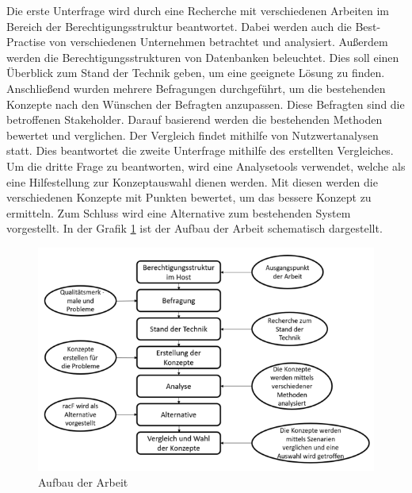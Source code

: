 Die erste Unterfrage wird durch eine Recherche mit verschiedenen Arbeiten im Bereich der Berechtigungsstruktur beantwortet.
Dabei werden auch die Best-Practise von verschiedenen Unternehmen betrachtet und analysiert.
Außerdem werden die Berechtigungsstrukturen von Datenbanken beleuchtet.
Dies soll einen Überblick zum Stand der Technik geben, um eine geeignete Lösung zu finden.
\newline
Anschließend wurden mehrere Befragungen durchgeführt, um die bestehenden Konzepte nach den Wünschen der Befragten anzupassen.
Diese Befragten sind die betroffenen Stakeholder.
Darauf basierend werden die bestehenden Methoden bewertet und verglichen.
Der Vergleich findet mithilfe von Nutzwertanalysen statt.
Dies beantwortet die zweite Unterfrage mithilfe des erstellten Vergleiches.
\newline
Um die dritte Frage zu beantworten, wird eine Analysetools verwendet, welche als eine Hilfestellung zur Konzeptauswahl dienen werden.
Mit diesen werden die verschiedenen Konzepte mit Punkten bewertet, um das bessere Konzept zu ermitteln.
Zum Schluss wird eine Alternative zum bestehenden System vorgestellt.
In der Grafik \ref{fig:vorgehen} ist der Aufbau der Arbeit schematisch dargestellt.
\newpage
\begin{figure}[h!]
\hspace*{-3cm}
 \centering
 \includegraphics[width=1.5\textwidth]{gfx/Picture/Vorgehen.PNG}
 \caption{Aufbau der Arbeit}
 \label{fig:vorgehen}
\end{figure}